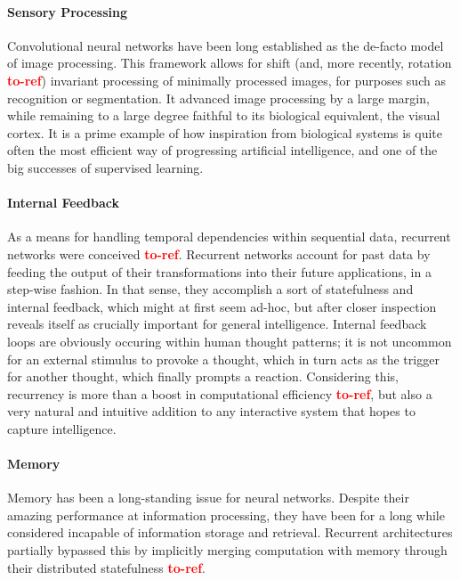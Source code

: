 \documentclass[]{article}
\newcommand\toref{\textcolor{red}{\bf{to-ref}}}
\begin{document}
\paragraph{Sensory Processing} Convolutional neural networks have been long established as the de-facto model of image processing. This framework allows for shift (and, more recently, rotation \toref ) invariant processing of minimally processed images, for purposes such as recognition or segmentation. It advanced image processing by a large margin, while remaining to a large degree faithful to its biological equivalent, the visual cortex. It is a prime example of how inspiration from biological systems is quite often the most efficient way of progressing artificial intelligence, and one of the big successes of supervised learning.

\paragraph{Internal Feedback}
As a means for handling temporal dependencies within sequential data, recurrent networks were conceived \toref . Recurrent networks account for past data by feeding the output of their transformations into their future applications, in a step-wise fashion. In that sense, they accomplish a sort of statefulness and internal feedback, which might at first seem ad-hoc, but after closer inspection reveals itself as crucially important for general intelligence. Internal feedback loops are obviously occuring within human thought patterns; it is not uncommon for an external stimulus to provoke a thought, which in turn acts as the trigger for another thought, which finally prompts a reaction. Considering this, recurrency is more than a boost in computational efficiency \toref , but also a very natural and intuitive addition to any interactive system that hopes to capture intelligence.

\paragraph{Memory}
Memory has been a long-standing issue for neural networks. Despite their amazing performance at information processing, they have been for a long while considered incapable of information storage and retrieval. Recurrent architectures partially bypassed this by implicitly merging computation with memory through their distributed statefulness \toref . 
\end{document}
